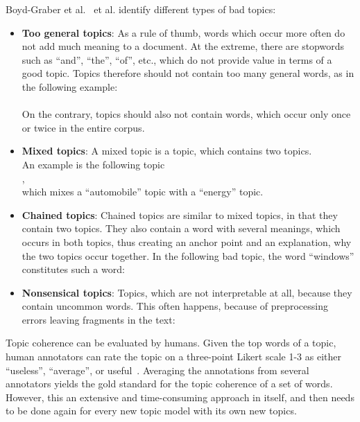 \documentclass[
        a4paper,
        titlepage,
        twoside,
        parskip
        ]{scrbook}
\theoremstyle{break}
\begin{document}
Boyd-Graber et al.~\cite{Boyd-graber2014} et al. identify different types of bad topics:
\begin{itemize}
  \item
    \textbf{Too general topics}: As a rule of thumb, words which occur more often do not add much meaning to a document.
    At the extreme, there are stopwords such as ``and'', ``the'', ``of'', etc., which do not provide value in terms of a good topic.
    Topics therefore should not contain too many general words, as in the following example: \\
    \hspace*{0cm}  \\
    On the contrary, topics should also not contain words, which occur only once or twice in the entire corpus.
  \item
    \textbf{Mixed topics}: A mixed topic is a topic, which contains two topics. \\
    An example is the following topic \\
    \hspace*{0cm} , \\
    which mixes a ``automobile'' topic with a ``energy'' topic.
  \item
    \textbf{Chained topics}: Chained topics are similar to mixed topics, in that they contain two topics.
    They also contain a word with several meanings, which occurs in both topics, thus creating an anchor point and an explanation, why the two topics occur together.
    In the following bad topic, the word ``windows'' constitutes such a word: \\
    \hspace*{0cm} 
  \item
    \textbf{Nonsensical topics}:
    Topics, which are not interpretable at all, because they contain uncommon words.
    This often happens, because of preprocessing errors leaving fragments in the text: \\
    \hspace*{0cm} 
\end{itemize}

Topic coherence can be evaluated by humans.
Given the top words of a topic, human annotators can rate the topic on a three-point Likert scale 1-3 as either ``useless'', ``average'', or useful~\cite{Aletras2013}.
Averaging the annotations from several annotators yields the gold standard for the topic coherence of a set of words.
However, this an extensive and time-consuming approach in itself, and then needs to be done again for every new topic model with its own new topics.
\end{document}
